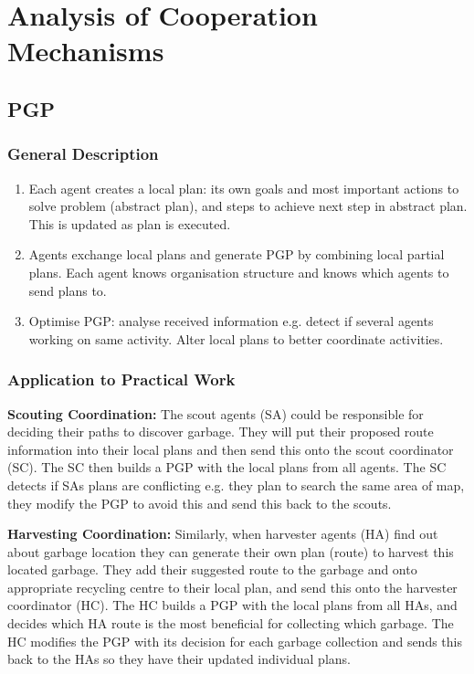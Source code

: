 \section{Analysis of Cooperation Mechanisms}
\label{sec:allCoop}



\subsection{PGP}

\subsubsection{General Description}

\begin{enumerate}
	\item Each agent creates a local plan: its own goals and most important actions to solve problem (abstract plan), and steps to achieve next step in abstract plan. This is updated as plan is executed.
	\item Agents exchange local plans and generate PGP by combining local partial plans. Each agent knows organisation structure and knows which agents to send plans to.
	\item Optimise PGP: analyse received information e.g. detect if several agents working on same activity. Alter local plans to better coordinate activities.

\end{enumerate}

\subsubsection{Application to Practical Work}

\textbf{Scouting Coordination:} The scout agents (SA) could be responsible for deciding their paths to discover garbage. They will put their proposed route information into their local plans and then send this onto the scout coordinator (SC). The SC then builds a PGP with the local plans from all agents. The SC detects if SAs plans are conflicting e.g. they plan to search the same area of map, they modify the PGP to avoid this and send this back to the scouts. 

\textbf{Harvesting Coordination:} Similarly, when harvester agents (HA) find out about garbage location they can generate their own plan (route) to harvest this located garbage. They add their suggested route to the garbage and onto appropriate recycling centre to their local plan, and send this onto the harvester coordinator (HC). The HC builds a PGP with the local plans from all HAs, and decides which HA route is the most beneficial for collecting which garbage. The HC modifies the PGP with its decision for each garbage collection and sends this back to the HAs so they have their updated individual plans. 

